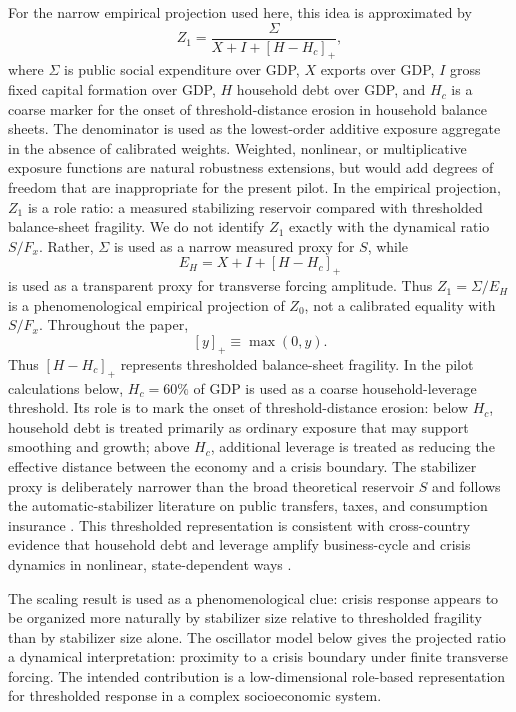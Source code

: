 \documentclass[11pt]{article}
\newcommand{\brpos}[1]{\left[#1\right]_+}
\begin{document}
For the narrow empirical projection used here, this idea is approximated by
\begin{equation}
Z_1=\frac{\Sigma}{X+I+\brpos{H-H_c}},
\label{eq:Z1}
\end{equation}
where $\Sigma$ is public social expenditure over GDP, $X$ exports over GDP, $I$ gross fixed capital formation over GDP, $H$ household debt over GDP, and $H_c$ is a coarse marker for the onset of threshold-distance erosion in household balance sheets. The denominator is used as the lowest-order additive exposure aggregate in the absence of calibrated weights. Weighted, nonlinear, or multiplicative exposure functions are natural robustness extensions, but would add degrees of freedom that are inappropriate for the present pilot. In the empirical projection, $Z_1$ is a role ratio: a measured stabilizing reservoir compared with thresholded balance-sheet fragility. We do not identify $Z_1$ exactly with the dynamical ratio $S/F_x$. Rather, $\Sigma$ is used as a narrow measured proxy for $S$, while
\[
E_H=X+I+\brpos{H-H_c}
\]
is used as a transparent proxy for transverse forcing amplitude. Thus $Z_1=\Sigma/E_H$ is a phenomenological empirical projection of $Z_0$, not a calibrated equality with $S/F_x$. Throughout the paper,
\begin{equation}
\brpos{y}\equiv \max(0,y).
\label{eq:positivepart}
\end{equation}
Thus $\brpos{H-H_c}$ represents thresholded balance-sheet fragility. In the pilot calculations below, $H_c=60\%$ of GDP is used as a coarse household-leverage threshold. Its role is to mark the onset of threshold-distance erosion: below $H_c$, household debt is treated primarily as ordinary exposure that may support smoothing and growth; above $H_c$, additional leverage is treated as reducing the effective distance between the economy and a crisis boundary. The stabilizer proxy is deliberately narrower than the broad theoretical reservoir $S$ and follows the automatic-stabilizer literature on public transfers, taxes, and consumption insurance \cite{Dolls2012,AuerbachFeenberg2000,McKayReis2016}. This thresholded representation is consistent with cross-country evidence that household debt and leverage amplify business-cycle and crisis dynamics in nonlinear, state-dependent ways \cite{MianSufiVerner2017,KumhofRanciereWinant2015,JordaSchularickTaylor2013}.

The scaling result is used as a phenomenological clue: crisis response appears to be organized more naturally by stabilizer size relative to thresholded fragility than by stabilizer size alone. The oscillator model below gives the projected ratio a dynamical interpretation: proximity to a crisis boundary under finite transverse forcing. The intended contribution is a low-dimensional role-based representation for thresholded response in a complex socioeconomic system.
\end{document}
